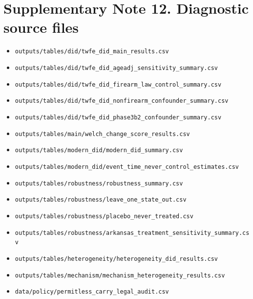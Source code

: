 \documentclass[10pt]{article}
\begin{document}
\section*{Supplementary Note 12. Diagnostic source files}


\begin{itemize}
\item \texttt{outputs/tables/did/twfe\_did\_main\_results.csv}
\item \texttt{outputs/tables/did/twfe\_did\_ageadj\_sensitivity\_summary.csv}
\item \texttt{outputs/tables/did/twfe\_did\_firearm\_law\_control\_summary.csv}
\item \texttt{outputs/tables/did/twfe\_did\_nonfirearm\_confounder\_summary.csv}
\item \texttt{outputs/tables/did/twfe\_did\_phase3b2\_confounder\_summary.csv}
\item \texttt{outputs/tables/main/welch\_change\_score\_results.csv}
\item \texttt{outputs/tables/modern\_did/modern\_did\_summary.csv}
\item \texttt{outputs/tables/modern\_did/event\_time\_never\_control\_estimates.csv}
\item \texttt{outputs/tables/robustness/robustness\_summary.csv}
\item \texttt{outputs/tables/robustness/leave\_one\_state\_out.csv}
\item \texttt{outputs/tables/robustness/placebo\_never\_treated.csv}
\item \texttt{outputs/tables/robustness/arkansas\_treatment\_sensitivity\_summary.csv}
\item \texttt{outputs/tables/heterogeneity/heterogeneity\_did\_results.csv}
\item \texttt{outputs/tables/mechanism/mechanism\_heterogeneity\_results.csv}
\item \texttt{data/policy/permitless\_carry\_legal\_audit.csv}
\end{itemize}
\end{document}
